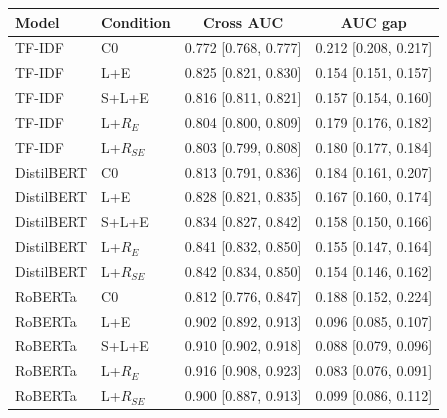 \begin{tabular}{@{}llcc@{}}
\toprule
Model & Condition & Cross AUC & AUC gap\\
\midrule
TF-IDF & C0 & 0.772 [0.768, 0.777] & 0.212 [0.208, 0.217]\\
TF-IDF & L+E & 0.825 [0.821, 0.830] & 0.154 [0.151, 0.157]\\
TF-IDF & S+L+E & 0.816 [0.811, 0.821] & 0.157 [0.154, 0.160]\\
TF-IDF & L+$R_E$ & 0.804 [0.800, 0.809] & 0.179 [0.176, 0.182]\\
TF-IDF & L+$R_{SE}$ & 0.803 [0.799, 0.808] & 0.180 [0.177, 0.184]\\
DistilBERT & C0 & 0.813 [0.791, 0.836] & 0.184 [0.161, 0.207]\\
DistilBERT & L+E & 0.828 [0.821, 0.835] & 0.167 [0.160, 0.174]\\
DistilBERT & S+L+E & 0.834 [0.827, 0.842] & 0.158 [0.150, 0.166]\\
DistilBERT & L+$R_E$ & 0.841 [0.832, 0.850] & 0.155 [0.147, 0.164]\\
DistilBERT & L+$R_{SE}$ & 0.842 [0.834, 0.850] & 0.154 [0.146, 0.162]\\
RoBERTa & C0 & 0.812 [0.776, 0.847] & 0.188 [0.152, 0.224]\\
RoBERTa & L+E & 0.902 [0.892, 0.913] & 0.096 [0.085, 0.107]\\
RoBERTa & S+L+E & 0.910 [0.902, 0.918] & 0.088 [0.079, 0.096]\\
RoBERTa & L+$R_E$ & 0.916 [0.908, 0.923] & 0.083 [0.076, 0.091]\\
RoBERTa & L+$R_{SE}$ & 0.900 [0.887, 0.913] & 0.099 [0.086, 0.112]\\
\bottomrule
\end{tabular}

